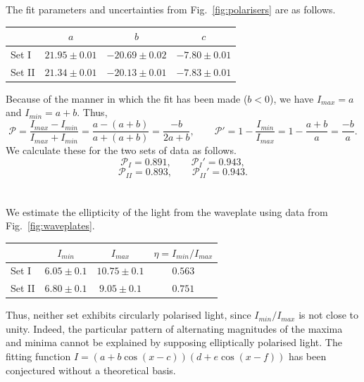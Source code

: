 \documentclass[11pt]{article}
\begin{document}
        The fit parameters and uncertainties from Fig.~\ref{fig:polarisers} are as follows.
        \begin{center}
        \begin{tabular}{l|ccc}
                        &       $a$             & $b$                   & $c$ \\\hline
                Set I   &  $21.95 \pm 0.01$     & $-20.69 \pm 0.02$     & $-7.80 \pm 0.01$ \\
                Set II  &  $21.34 \pm 0.01$     & $-20.13 \pm 0.01$     & $-7.83 \pm 0.01$
        \end{tabular}
        \end{center}

        Because of the manner in which the fit has been made ($b < 0$), we have $I_{max} = a$ and $I_{min} = a + b$. Thus,
        \[
                \mathcal{P} = \frac{I_{max} - I_{min}}{I_{max} + I_{min}} = \frac{a - (a + b)}{a + (a + b)} = \frac{-b}{2a + b}, \qquad
                \mathcal{P}' = 1 - \frac{I_{min}}{I_{max}} = 1 - \frac{a + b}{a} = \frac{-b}{a}.
        \]
        We calculate these for the two sets of data as follows.
        \[
                \mathcal{P}_{I} = 0.891, \qquad \mathcal{P}_{I}' = 0.943,
        \]
        \[
                \mathcal{P}_{II} = 0.893, \qquad \mathcal{P}_{II}' = 0.943.
        \]\\~\\ 
        We estimate the ellipticity of the light from the waveplate using data from Fig.~\ref{fig:waveplates}.
        \begin{center}
        \begin{tabular}{l|ccc}
                        &       $I_{min}$       & $I_{max}$             & $\eta = I_{min} / I_{max}$ \\\hline
                Set I   &  $6.05 \pm 0.1$       & $10.75 \pm 0.1$       & $0.563$ \\
                Set II  &  $6.80 \pm 0.1$       & $9.05 \pm 0.1$        & $0.751$
        \end{tabular}
        \end{center}
        Thus, neither set exhibits circularly polarised light, since $I_{min} / I_{max}$ is not close to unity.
        Indeed, the particular pattern of alternating magnitudes of the maxima and minima cannot be explained by supposing elliptically polarised light.
        The fitting function $I = (a + b\cos(x - c))(d + e\cos(x - f))$ has been conjectured without a theoretical basis.
        
\end{document}
